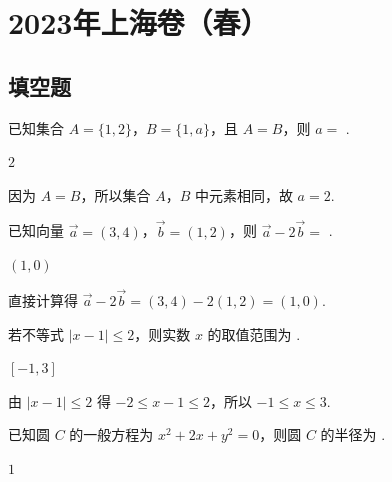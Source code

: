 \chapter{2023年上海卷（春）}

\section{填空题}

\begin{problem}
已知集合 \(A=\{1,2\}\)，\(B=\{1,a\}\)，且 \(A=B\)，则 \(a=\)\fillinblank{} .
\end{problem}

\begin{answer}
\(2\)
\end{answer}

\begin{solution}
因为 \(A=B\)，所以集合 \(A\)，\(B\) 中元素相同，故 \(a=2\).
\end{solution}

\begin{problem}
已知向量 \(\overrightarrow{a}=(3,4)\)，\(\overrightarrow{b}=(1,2)\)，则 \(\overrightarrow{a}-2\overrightarrow{b}=\)\fillinblank{} .
\end{problem}

\begin{answer}
\(\left(1,0\right)\)
\end{answer}

\begin{solution}
直接计算得 \(\overrightarrow{a}-2\overrightarrow{b}=(3,4)-2(1,2)=\left(1,0\right)\).
\end{solution}

\begin{problem}
若不等式 \(\left|x-1\right|\le 2\)，则实数 \(x\) 的取值范围为\fillinblank{} .
\end{problem}

\begin{answer}
\(\left[-1,3\right]\)
\end{answer}

\begin{solution}
由 \(\left|x-1\right|\le 2\) 得 \(-2\le x-1\le 2\)，所以 \(-1\le x\le 3\).
\end{solution}

\begin{problem}
已知圆 \(C\) 的一般方程为 \(x^2+2x+y^2=0\)，则圆 \(C\) 的半径为\fillinblank{} .
\end{problem}

\begin{answer}
\(1\)
\end{answer}

